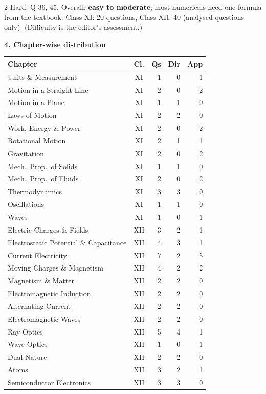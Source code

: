 \begin{multicols}{2}
{\footnotesize Hard: Q 36, 45. Overall: \textbf{easy to moderate}; most numericals need one formula from the textbook. Class XI: 20 questions, Class XII: 40 (analysed questions only). (Difficulty is the editor's assessment.)}\par\medskip
\columnbreak
\textbf{\color{crimson}4. Chapter-wise distribution}\par\smallskip
{\footnotesize\begin{tabular}{@{}p{4.7cm}c@{\,}r@{\,}r@{\,}r@{}}\toprule
Chapter & Cl. & Qs & Dir & App\\\midrule
Units \& Measurement & XI & 1 & 0 & 1\\
Motion in a Straight Line & XI & 2 & 0 & 2\\
Motion in a Plane & XI & 1 & 1 & 0\\
Laws of Motion & XI & 2 & 2 & 0\\
Work, Energy \& Power & XI & 2 & 0 & 2\\
Rotational Motion & XI & 2 & 1 & 1\\
Gravitation & XI & 2 & 0 & 2\\
Mech.\ Prop.\ of Solids & XI & 1 & 1 & 0\\
Mech.\ Prop.\ of Fluids & XI & 2 & 0 & 2\\
Thermodynamics & XI & 3 & 3 & 0\\
Oscillations & XI & 1 & 1 & 0\\
Waves & XI & 1 & 0 & 1\\
Electric Charges \& Fields & XII & 3 & 2 & 1\\
Electrostatic Potential \& Capacitance & XII & 4 & 3 & 1\\
Current Electricity & XII & 7 & 2 & 5\\
Moving Charges \& Magnetism & XII & 4 & 2 & 2\\
Magnetism \& Matter & XII & 2 & 2 & 0\\
Electromagnetic Induction & XII & 2 & 2 & 0\\
Alternating Current & XII & 2 & 2 & 0\\
Electromagnetic Waves & XII & 2 & 2 & 0\\
Ray Optics & XII & 5 & 4 & 1\\
Wave Optics & XII & 1 & 0 & 1\\
Dual Nature & XII & 2 & 2 & 0\\
Atoms & XII & 3 & 2 & 1\\
Semiconductor Electronics & XII & 3 & 3 & 0\\
\bottomrule\end{tabular}}\par\medskip

\end{multicols}
